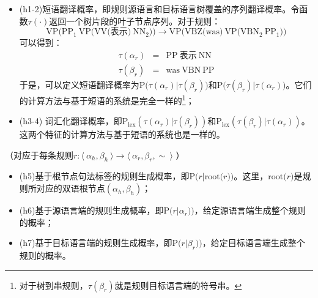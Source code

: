 \begin{itemize}
\vspace{0.5em}
\item (h1-2)短语翻译概率，即规则源语言和目标语言树覆盖的序列翻译概率。令函数$\tau(\cdot)$返回一个树片段的叶子节点序列。对于规则：
\begin{displaymath}
\textrm{VP(}\textrm{PP}_1\ \textrm{VP(VV(表示)}\ \textrm{NN}_2\textrm{))} \rightarrow \textrm{VP(VBZ(was)}\ \textrm{VP(}\textrm{VBN}_2\ \textrm{PP}_1\textrm{))}
\end{displaymath}
\noindent 可以得到：
\begin{eqnarray}
\tau( \alpha_r ) & = & \textrm{PP}\ \textrm{表示}\ \textrm{NN} \nonumber \\
\tau( \beta_r ) & = & \textrm{was}\ \textrm{VBN}\ \textrm{PP} \nonumber
\end{eqnarray}
\noindent 于是，可以定义短语翻译概率为$\textrm{P(}\tau( \alpha_r )|\tau( \beta_r ))$和$\textrm{P(}\tau( \beta_r )|\tau( \alpha_r ))$。它们的计算方法与基于短语的系统是完全一样的\footnote[9]{对于树到串规则，$\tau( \beta_r )$就是规则目标语言端的符号串。}；
\vspace{0.5em}
\item (h3-4) 词汇化翻译概率，即$\textrm{P}_{\textrm{lex}}(\tau( \alpha_r )|\tau( \beta_r ))$和$\textrm{P}_{\textrm{lex}}(\tau( \beta_r )|\tau( \alpha_r ))$。这两个特征的计算方法与基于短语的系统也是一样的。
\vspace{0.5em}
\end{itemize}

\vspace{0.5em}
（对应于每条规则$r : \langle\  \alpha_h, \beta_h\ \rangle \to \langle\ \alpha_r, \beta_r, \sim\ \rangle$ ）

\begin{itemize}
\vspace{0.5em}
\item (h5)基于根节点句法标签的规则生成概率，即$\textrm{P(}r|\textrm{root(}r\textrm{))}$。这里，$\textrm{root(}r)$是规则所对应的双语根节点$(\alpha_h,\beta_h)$；
\vspace{0.5em}
\item (h6)基于源语言端的规则生成概率，即$\textrm{P(}r|\alpha_r))$，给定源语言端生成整个规则的概率；
\vspace{0.5em}
\item (h7)基于目标语言端的规则生成概率，即$\textrm{P(}r|\beta_r))$，给定目标语言端生成整个规则的概率。
\end{itemize}

